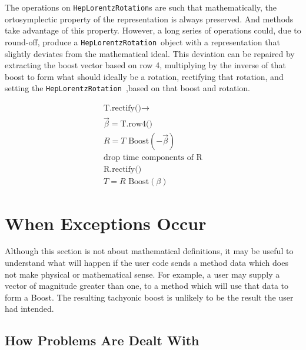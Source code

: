 \documentclass[twoside,12pt]{article}
\def \LT {{\tt HepLorentzRotation}}
\begin{document}
The operations on \LT s are such that mathematically, the ortosymplectic
property of 
the representation is always preserved.  And methods take advantage of this 
property. 
However, a long series of operations could, due to round-off, produce a 
\LT\ object with a representation that slightly deviates from the  mathematical
ideal.  This deviation can be repaired by extracting the boost vector based on
row 4, multiplying by the inverse of that boost to form what should ideally be 
a rotation, rectifying that rotation, and setting the \LT\ ,based on that boost
and rotation.

\begin{eqnarray}
\label{eq:rectLT}
\mbox{T.rectify()} \rightarrow \nonumber \\
  \vec{\beta} = \mbox {T.row4()} \nonumber \\
  R = T \mbox{ Boost}(-\vec{\beta})   \nonumber \\
  \mbox {drop time components of R} \nonumber \\
  \mbox {R.rectify()} 		    \nonumber \\
  T = R \mbox{ Boost}(\beta)
\end{eqnarray}

\newpage
\section{When Exceptions Occur}


Although this section is not about mathematical definitions, it may be useful
to understand what will happen if the user code sends a method  
data which does not make physical or mathematical sense.  For example, 
a user may supply a vector of magnitude greater than one, to a method
which will use that data to form a Boost.  The resulting tachyonic boost
is unlikely to be the result the user had intended.

\subsection{How Problems Are Dealt With}
\end{document}
